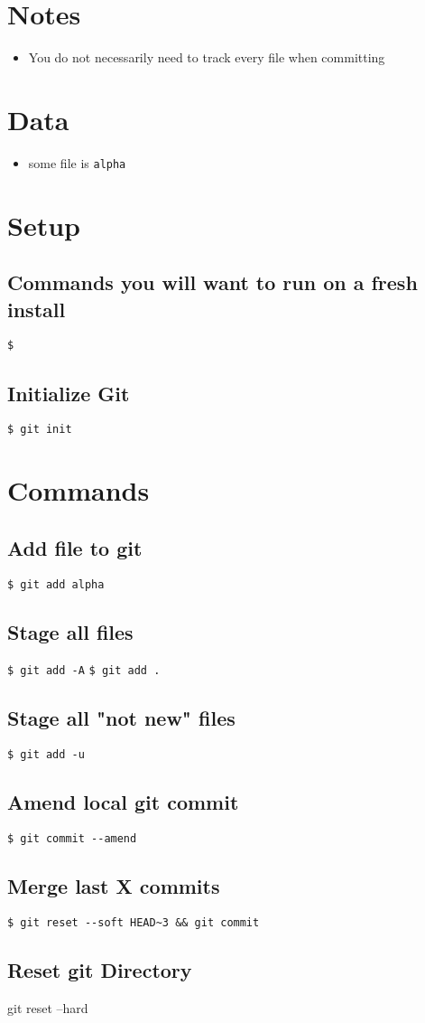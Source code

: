 \documentclass{article}
\title{\vspace{-2.25cm}{\small Git}\vspace{-1.5cm}}
\date{}
\begin{document}
\maketitle
\begin{multicols}{3}
\section{Notes}
\begin{itemize}
\item You do not necessarily need to track every file when committing
\end{itemize}
\section{Data}
\begin{itemize}
\item some file is \texttt{alpha}
\end{itemize}
\section{Setup}
\subsection{Commands you will want to run on a fresh install}
\lstinline|$ | %
\subsection{Initialize Git}
\lstinline|$ git init|
\section{Commands}
\subsection{Add file to git}
\lstinline|$ git add alpha|
\subsection{Stage all files}
\lstinline|$ git add -A|
\lstinline|$ git add .|
\subsection{Stage all "not new" files}
\lstinline|$ git add -u|
\subsection{Amend local git commit}
\lstinline|$ git commit --amend|
\subsection{Merge last X commits}
\lstinline|$ git reset --soft HEAD~3 && git commit|
\subsection{Reset git Directory}
git reset --hard
\end{multicols}
\end{document}
